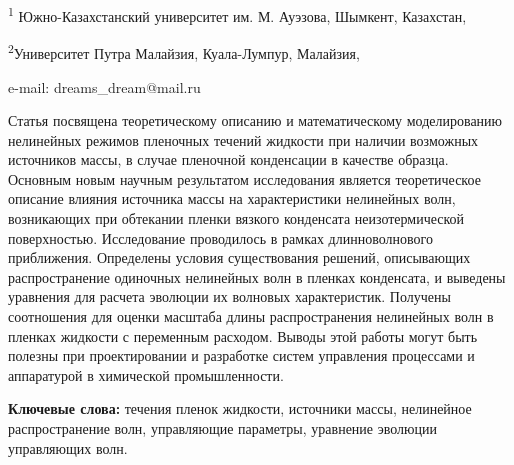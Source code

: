 \begin{affiliation}
\textsuperscript{1} Южно-Казахстанский университет им. М. Ауэзова, Шымкент, Казахстан,

\textsuperscript{2}Университет Путра Малайзия, Куала-Лумпур, Малайзия,

e-mail: dreams\_dream@mail.ru
\end{affiliation}

Статья посвящена теоретическому описанию и математическому моделированию
нелинейных режимов пленочных течений жидкости при наличии возможных
источников массы, в случае пленочной конденсации в качестве образца.
Основным новым научным результатом исследования является теоретическое
описание влияния источника массы на характеристики нелинейных волн,
возникающих при обтекании пленки вязкого конденсата неизотермической
поверхностью. Исследование проводилось в рамках длинноволнового
приближения. Определены условия существования решений, описывающих
распространение одиночных нелинейных волн в пленках конденсата, и
выведены уравнения для расчета эволюции их волновых характеристик.
Получены соотношения для оценки масштаба длины распространения
нелинейных волн в пленках жидкости с переменным расходом. Выводы этой
работы могут быть полезны при проектировании и разработке систем
управления процессами и аппаратурой в химической промышленности.

{\bfseries Ключевые слова:} течения пленок жидкости, источники массы,
нелинейное распространение волн, управляющие параметры, уравнение
эволюции управляющих волн.


